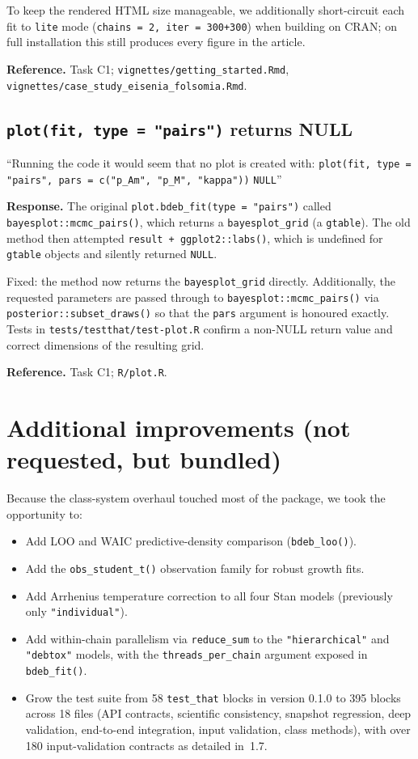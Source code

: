 \documentclass[11pt,a4paper]{article}
\newcommand{\code}[1]{\texttt{#1}}
\begin{document}
To keep the rendered HTML size manageable, we additionally
short-circuit each fit to \code{lite} mode
(\verb|chains = 2, iter = 300+300|) when building on CRAN; on full
installation this still produces every figure in the article.

\textbf{Reference.} Task C1; \code{vignettes/getting\_started.Rmd},
\code{vignettes/case\_study\_eisenia\_folsomia.Rmd}.

\subsection{\code{plot(fit, type = "pairs")} returns NULL}

\begin{displayquote}
``Running the code it would seem that no plot is created with:
\verb|plot(fit, type = "pairs", pars = c("p_Am", "p_M", "kappa"))|
\code{NULL}''
\end{displayquote}

\textbf{Response.} The original
\verb|plot.bdeb_fit(type = "pairs")| called
\code{bayesplot::mcmc\_pairs()}, which returns a
\code{bayesplot\_grid} (a \code{gtable}). The old method then
attempted \verb|result + ggplot2::labs()|, which is undefined for
\code{gtable} objects and silently returned \code{NULL}.

Fixed: the method now returns the \code{bayesplot\_grid} directly.
Additionally, the requested parameters are passed through to
\code{bayesplot::mcmc\_pairs()} via
\code{posterior::subset\_draws()} so that the \code{pars} argument is
honoured exactly. Tests in \code{tests/testthat/test-plot.R} confirm
a non-NULL return value and correct dimensions of the resulting
grid.

\textbf{Reference.} Task C1; \code{R/plot.R}.

\section{Additional improvements (not requested, but bundled)}

Because the class-system overhaul touched most of the package, we
took the opportunity to:

\begin{itemize}[nosep]
\item Add LOO and WAIC predictive-density comparison
  (\code{bdeb\_loo()}).
\item Add the \code{obs\_student\_t()} observation family for robust
  growth fits.
\item Add Arrhenius temperature correction to all four Stan models
  (previously only \verb|"individual"|).
\item Add within-chain parallelism via \code{reduce\_sum} to the
  \verb|"hierarchical"| and \verb|"debtox"| models, with the
  \code{threads\_per\_chain} argument exposed in \code{bdeb\_fit()}.
\item Grow the test suite from 58 \code{test\_that} blocks in version
  0.1.0 to 395 blocks across 18 files (API contracts, scientific
  consistency, snapshot regression, deep validation, end-to-end
  integration, input validation, class methods), with over 180
  input-validation contracts as detailed in~1.7.
\end{itemize}
\end{document}
